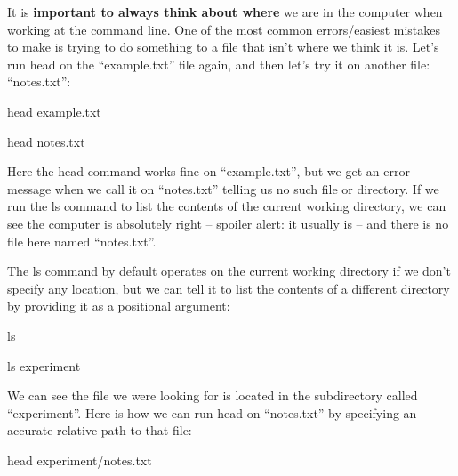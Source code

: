 \documentclass[
]{book}
\newenvironment{Shaded}{\begin{snugshade}}{\end{snugshade}}
\newcommand{\FunctionTok}[1]{\textcolor[rgb]{0.00,0.00,0.00}{#1}}
\newcommand{\NormalTok}[1]{#1}
\begin{document}
It is \textbf{important to always think about where} we are in the computer when working at the command line. One of the most common errors/easiest mistakes to make is trying to do something to a file that isn't where we think it is. Let's run head on the ``example.txt'' file again, and then let's try it on another file: ``notes.txt'':

\begin{Shaded}
\begin{Highlighting}[]
\FunctionTok{head}\NormalTok{ example.txt}
\end{Highlighting}
\end{Shaded}

\begin{Shaded}
\begin{Highlighting}[]
\FunctionTok{head}\NormalTok{ notes.txt}
\end{Highlighting}
\end{Shaded}

Here the head command works fine on ``example.txt'', but we get an error message when we call it on ``notes.txt'' telling us no such file or directory. If we run the ls command to list the contents of the current working directory, we can see the computer is absolutely right -- spoiler alert: it usually is -- and there is no file here named ``notes.txt''.

The ls command by default operates on the current working directory if we don't specify any location, but we can tell it to list the contents of a different directory by providing it as a positional argument:

\begin{Shaded}
\begin{Highlighting}[]
    \FunctionTok{ls}
\end{Highlighting}
\end{Shaded}

\begin{Shaded}
\begin{Highlighting}[]
    \FunctionTok{ls}\NormalTok{ experiment}
\end{Highlighting}
\end{Shaded}

We can see the file we were looking for is located in the subdirectory called ``experiment''. Here is how we can run head on ``notes.txt'' by specifying an accurate relative path to that file:

\begin{Shaded}
\begin{Highlighting}[]
    \FunctionTok{head}\NormalTok{ experiment/notes.txt}
\end{Highlighting}
\end{Shaded}
\end{document}
